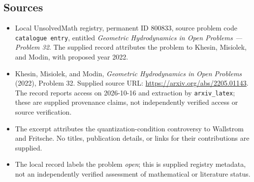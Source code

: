 \documentclass[11pt]{article}
\begin{document}
\subsection{Sources}
\begin{itemize}
\item Local UnsolvedMath registry, permanent ID \(800833\), source problem code \texttt{catalogue entry}, entitled \emph{Geometric Hydrodynamics in Open Problems --- Problem 32}. The supplied record attributes the problem to Khesin, Misiolek, and Modin, with proposed year 2022.
\item Khesin, Misiolek, and Modin, \emph{Geometric Hydrodynamics in Open Problems} (2022), Problem 32. Supplied source URL: \url{https://arxiv.org/abs/2205.01143}. The record reports access on 2026-10-16 and extraction by \texttt{arxiv\_latex}; these are supplied provenance claims, not independently verified access or source verification.
\item The excerpt attributes the quantization-condition controversy to Wallstrom and Fritsche. No titles, publication details, or links for their contributions are supplied.
\item The local record labels the problem \emph{open}; this is supplied registry metadata, not an independently verified assessment of mathematical or literature status.
\end{itemize}
\end{document}
